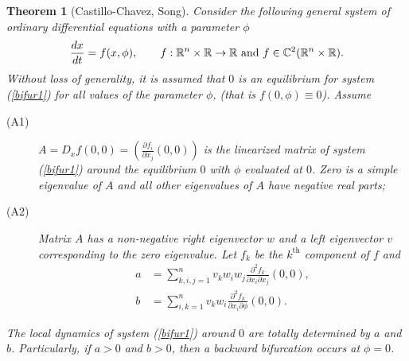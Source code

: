 \documentclass[review]{elsarticle}
\newtheorem{theorem}{Theorem}
\begin{document}
\medskip

\begin{theorem}[Castillo-Chavez, Song]\label{thm:chavez}
Consider the following general system of ordinary differential equations with a parameter $\phi$
\begin{align}\label{bifur1}
\frac{dx}{dt}=f(x,\phi),\qquad f:\Bbb R^n\times \Bbb R\to\Bbb R  \mbox{ and } f\in \Bbb C^2(\Bbb R^n\times \Bbb R).
\end{align}
Without loss of generality, it is assumed that $0$ is an equilibrium for system (\ref{bifur1}) for all values of the parameter $\phi$, (that is $f(0,\phi)\equiv 0$). Assume
\begin{description}
  \item[(A1)] $A=D_xf(0,0)=\left(\frac{\partial f_i}{\partial x_j}(0,0)\right)$ is the linearized matrix of system (\ref{bifur1}) around the equilibrium $0$ with $\phi$ evaluated at $0$. Zero is a simple eigenvalue of $A$ and all other eigenvalues of $A$ have negative real parts;

  \item[(A2)] Matrix $A$ has a non-negative right eigenvector $w$ and a left eigenvector $v$ corresponding to the zero eigenvalue. Let $f_k$ be the $k^{\mbox{th}}$ component of $f$ and
  \begin{equation}
  \begin{aligned}
  a&= \sum_{k,i,j=1}^{n}v_kw_iw_j\frac{\partial^2f_k}{\partial x_i \partial x_j}(0,0),\\
  b&= \sum_{i,k=1}^{n} v_kw_i \frac{\partial^2f_k}{\partial x_i \partial \phi}(0,0).
  \end{aligned}
  \end{equation}
\end{description}
The local dynamics of system (\ref{bifur1}) around $0$ are totally determined by $a$ and $b$. Particularly, if $a > 0$ and $b > 0$, then a backward bifurcation occurs at $\phi= 0$.
\end{theorem}
\end{document}
